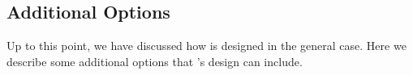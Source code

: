 %
%

\subsection{Additional Options}
Up to this point, we have discussed how \system{} is designed in the general case.  Here we describe some 
additional options that \system{}'s design can include.



